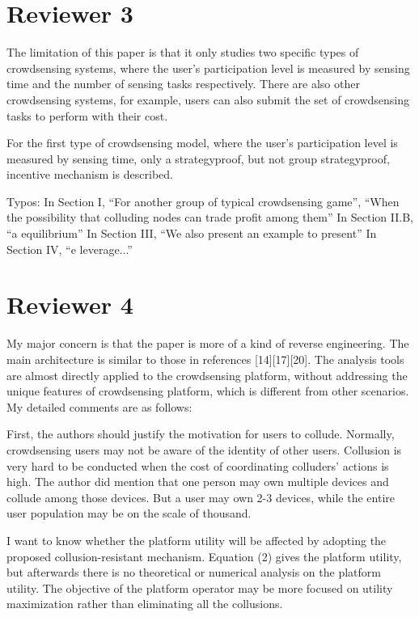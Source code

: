 \documentclass[a4paper,11pt]{exam}
\begin{document}
\begin{questions}
\section{Reviewer 3}
\question The limitation of this paper is that it only studies two specific types of crowdsensing systems, where the user's participation level is measured by sensing time and the number of sensing tasks respectively. There are also other crowdsensing systems, for example, users can also submit the set of crowdsensing tasks to perform with their cost.

\question For the first type of crowdsensing model, where the user's participation level is measured by sensing time, only a strategyproof, but not group strategyproof, incentive mechanism is described.

\question Typos: 
In Section I, ``For another group of typical crowdsensing game'', ``When the possibility that colluding nodes can trade profit among them''
In Section II.B, ``a equilibrium''
In Section III, ``We also present an example to present''
In Section IV, ``e leverage...''

\section{Reviewer 4}
\question My major concern is that the paper is more of a kind of reverse engineering. The main architecture is similar to those in references [14][17][20]. The analysis tools are almost directly applied to the crowdsensing platform, without addressing the unique features of crowdsensing platform, which is different from other scenarios. My detailed comments are as follows:

\question First, the authors should justify the motivation for users to collude. Normally, crowdsensing users may not be aware of the identity of other users. Collusion is very hard to be conducted when the cost of coordinating colluders’ actions is high. The author did mention that one person may own multiple devices and collude among those devices. But a user may own 2-3 devices, while the entire user population may be on the scale of thousand. 

\question I want to know whether the platform utility will be affected by adopting the proposed collusion-resistant mechanism. Equation (2) gives the platform utility, but afterwards there is no theoretical or numerical analysis on the platform utility. The objective of the platform operator may be more focused on utility maximization rather than eliminating all the collusions.


\end{questions}
\end{document}
